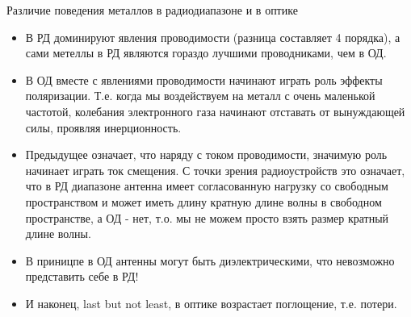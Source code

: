 \documentclass[9pt, compress, xcolor=table]{beamer}
\begin{document}
\begin{frame}{Различие поведения металлов в радиодиапазоне и в оптике}
\begin{itemize}
\item В РД доминируют явления проводимости (разница составляет 4 порядка), а сами  метеллы в РД являются гораздо лучшими проводниками, чем в ОД.

\item В ОД вместе с явлениями проводимости начинают играть роль эффекты поляризации. Т.е. когда мы воздействуем на металл с очень маленькой частотой, колебания электронного газа начинают отставать от вынуждающей силы, проявляя инерционность.

\item Предыдущее означает, что наряду с током проводимости, значимую роль начинает играть ток смещения. С точки зрения радиоустройств это означает, что в РД диапазоне антенна имеет согласованную нагрузку со свободным пространством и может иметь длину кратную длине волны в свободном пространстве, а ОД - нет, т.о. мы не можем просто взять размер кратный длине волны.

\item В приницпе в ОД антенны могут быть диэлектрическими, что невозможно представить себе в РД!

\item И наконец, last but not least, в оптике возрастает поглощение, т.е. потери.
\end{itemize}

\end{frame}
\end{document}
